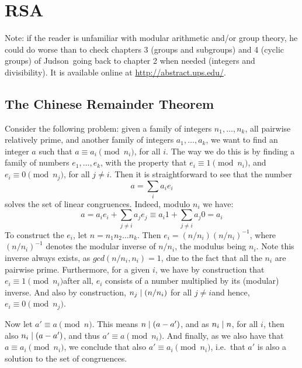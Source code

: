 
\chapter{RSA}
\label{cha:rsa}

Note: if the reader is unfamiliar with modular arithmetic and/or group theory, he could do worse than to check chapters 3 (groups and subgroups) and 4 (cyclic groups) of Judson~\cite{Judson:AbstractAlgebra}\emd going back to chapter 2 when needed (integers and divisibility). It is available online at \url{http://abstract.ups.edu/}.

\section{The Chinese Remainder Theorem}
  \label{sec:CRT}
  Consider the following problem: given a family of integers $n_1, \dots, n_k$, all pairwise relatively prime, and another family of integers $a_1, \dots, a_k$, we want to find an integer $a$ such that $a \equiv a_i \pmod{n_i}$, for all $i$. The way we do this is by finding a family of numbers $e_1, \dots, e_k$, with the property that $e_i \equiv 1 \pmod{n_i}$, and $e_i \equiv 0 \pmod{n_j}$, for all $j\neq i$. Then it is straightforward to see that the number
  \begin{equation}
    a = \sum_{i} a_ie_i
  \end{equation}
  solves the set of linear congruences. Indeed, modulo $n_i$ we have:
  \begin{equation}
    a = a_ie_i + \sum_{j\neq i} a_je_j \equiv a_i1 + \sum_{j\neq i} a_j0 = a_i
  \end{equation}
  To construct the $e_i$, let $n = n_1n_2\dots n_k$. Then $e_i = (n/n_i)(n/n_i)^{-1}$, where $(n/n_i)^{-1}$ denotes the modular inverse of $n/n_i$, the modulus being $n_i$. Note this inverse always exists, as $gcd(n/n_i, n_i) = 1$, due to the fact that all the $n_i$ are pairwise prime. Furthermore, for a given $i$, we have by construction that $e_i \equiv 1 \pmod{n_i}$\emd after all, $e_i$ consists of a number multiplied by its (modular) inverse. And also by construction, $n_j\mathrel{|} (n/n_i)$ for all $j\neq i$\emd and hence, $e_i \equiv 0 \pmod{n_j}$.

  Now let $a' \equiv a \pmod{n}$. This means $n\mathrel{|} (a-a')$, and as $n_i\mathrel{|} n$, for all $i$, then also $n_i\mathrel{|} (a-a')$, and thus $a' \equiv a \pmod{n_i}$. And finally, as we also have that $a \equiv a_i \pmod{n_i}$, we conclude that also $a' \equiv a_i \pmod{n_i}$, i.e.\ that $a'$ is also a solution to the set of congruences.

